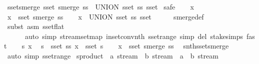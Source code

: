 \begin{isabellebody}
{\isafoldproof}%
%
\isadelimproof
\isanewline
%
\endisadelimproof
\isanewline
{}\isamarkupfalse%
\ sset{\isacharunderscore}smerge{\isacharcolon}\ {\isachardoublequoteopen}sset\ {\isacharparenleft}smerge\ ss{\isacharparenright}\ {\isacharequal}\ UNION\ {\isacharparenleft}sset\ ss{\isacharparenright}\ sset{\isachardoublequoteclose}\isanewline
%
\isadelimproof
%
\endisadelimproof
%
\isatagproof
{}\isamarkupfalse%
\ safe\isanewline
\ \ \isamarkupfalse%
\ x\ \isamarkupfalse%
\ {\isachardoublequoteopen}x\ {\isasymin}\ sset\ {\isacharparenleft}smerge\ ss{\isacharparenright}{\isachardoublequoteclose}\isanewline
\ \ \isamarkupfalse%
\ {\isachardoublequoteopen}x\ {\isasymin}\ UNION\ {\isacharparenleft}sset\ ss{\isacharparenright}\ sset{\isachardoublequoteclose}\isanewline
\ \ \ \ \isamarkupfalse%
\ smerge{\isacharunderscore}def\ \isamarkupfalse%
\ {\isacharparenleft}subst\ {\isacharparenleft}asm{\isacharparenright}\ sset{\isacharunderscore}flat{\isacharparenright}\isanewline
\ \ \ \ \ \ {\isacharparenleft}auto\ simp{\isacharcolon}\ stream{\isachardot}set{\isacharunderscore}map\ in{\isacharunderscore}set{\isacharunderscore}conv{\isacharunderscore}nth\ sset{\isacharunderscore}range\ simp\ del{\isacharcolon}\ stake{\isachardot}simps{\isacharcomma}\ fast{\isacharplus}{\isacharparenright}\isanewline
{}\isamarkupfalse%
\isanewline
\ \ \isamarkupfalse%
\ s\ x\ \isamarkupfalse%
\ {\isachardoublequoteopen}s\ {\isasymin}\ sset\ ss{\isachardoublequoteclose}\ {\isachardoublequoteopen}x\ {\isasymin}\ sset\ s{\isachardoublequoteclose}\isanewline
\ \ \isamarkupfalse%
\ {\isachardoublequoteopen}x\ {\isasymin}\ sset\ {\isacharparenleft}smerge\ ss{\isacharparenright}{\isachardoublequoteclose}\ \isamarkupfalse%
\ snth{\isacharunderscore}sset{\isacharunderscore}smerge\ \isamarkupfalse%
\ {\isacharparenleft}auto\ simp{\isacharcolon}\ sset{\isacharunderscore}range{\isacharparenright}\isanewline
{}\isamarkupfalse%
%
\endisatagproof
{\isafoldproof}%
%
\isadelimproof
%
\endisadelimproof
%
\isadelimdocument
%
\endisadelimdocument
%
\isatagdocument
%
\isamarkuptrue%
%
\endisatagdocument
{\isafolddocument}%
%
\isadelimdocument
%
\endisadelimdocument
{}\isamarkupfalse%
\ sproduct\ {\isacharcolon}{\isacharcolon}\ {\isachardoublequoteopen}{\isacharprime}a\ stream\ {\isasymRightarrow}\ {\isacharprime}b\ stream\ {\isasymRightarrow}\ {\isacharparenleft}{\isacharprime}a\ {\isasymtimes}\ {\isacharprime}b{\isacharparenright}\ stream{\isachardoublequoteclose}\ \isanewline

\end{isabellebody}
